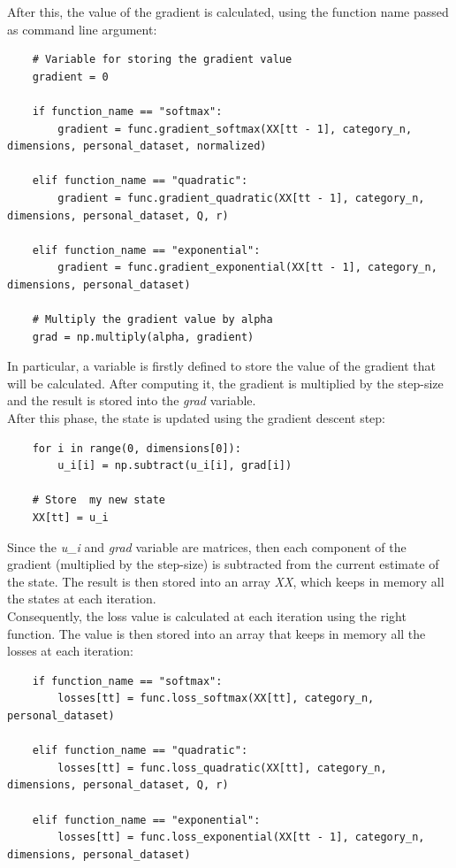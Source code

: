 \documentclass[a4paper,11pt,oneside]{book}
\begin{document}
After this, the value of the gradient is calculated, using the function name passed as command line argument:
\begin{lstlisting}
    # Variable for storing the gradient value    
    gradient = 0

    if function_name == "softmax":
        gradient = func.gradient_softmax(XX[tt - 1], category_n, dimensions, personal_dataset, normalized)
	
    elif function_name == "quadratic":
        gradient = func.gradient_quadratic(XX[tt - 1], category_n, dimensions, personal_dataset, Q, r)
	
    elif function_name == "exponential":
        gradient = func.gradient_exponential(XX[tt - 1], category_n, dimensions, personal_dataset)
	
    # Multiply the gradient value by alpha
    grad = np.multiply(alpha, gradient)
\end{lstlisting}
In particular, a variable is firstly defined to store the value of the gradient that will be calculated. After computing it, the gradient is multiplied by the step-size and the result is stored into the \textit{grad} variable. \\

After this phase, the state is updated using the gradient descent step:
\begin{lstlisting}
    for i in range(0, dimensions[0]):
        u_i[i] = np.subtract(u_i[i], grad[i])

    # Store  my new state
    XX[tt] = u_i
\end{lstlisting}
Since the \textit{u\_i} and \textit{grad} variable are matrices, then each component of the gradient (multiplied by the step-size) is subtracted from the current estimate of the state. The result is then stored into an array \textit{XX}, which keeps in memory all the states at each iteration. \\

Consequently, the loss value is calculated at each iteration using the right function. The value is then stored into an array that keeps in memory all the losses at each iteration:
\begin{lstlisting}
    if function_name == "softmax":
        losses[tt] = func.loss_softmax(XX[tt], category_n, personal_dataset)

    elif function_name == "quadratic":
        losses[tt] = func.loss_quadratic(XX[tt], category_n, dimensions, personal_dataset, Q, r)

    elif function_name == "exponential":
        losses[tt] = func.loss_exponential(XX[tt - 1], category_n, dimensions, personal_dataset)
\end{lstlisting}
\end{document}
